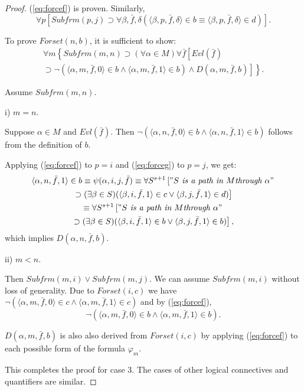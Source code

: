 \documentclass{asl}
\theoremstyle{definition}
\begin{document}
\begin{proof}
(\ref{eq:forcef}) is proven. Similarly,
\begin{equation}
\forall p\left[Subfrm(p,j)\supset \forall\beta,\bar{f},\delta\left(\langle\beta, p,\bar{f},\delta\rangle\in b\equiv\langle\beta, p,\bar{f},\delta\rangle\in d \right) \right].
\label{eq:forceg}
\end{equation}

To prove $Forset(n,b)$, it is sufficient to show:
\begin{multline}
\forall m\left\lbrace Subfrm(m,n)\supset(\forall\alpha\in M)\forall\bar{f}\left[Evl(\bar{f})
\right.
\right.
\\
\left.
\left.
\supset
\neg(\langle\alpha, m,\bar{f},0\rangle\in b\wedge\langle\alpha, m,\bar{f},1\rangle\in b)\wedge D(\alpha,m,\bar{f},b)\right]\right\rbrace .
\label{eq:forcea}
\end{multline}

Assume $Subfrm(m,n)$.

i) $m=n$.

Suppose $\alpha\in M$ and $Evl(\bar{f})$. Then $\neg(\langle\alpha, n,\bar{f},0\rangle\in b\wedge\langle\alpha, n,\bar{f},1\rangle\in b)$ follows from the definition of $b$.

Applying (\ref{eq:forcef}) to $p=i$ and (\ref{eq:forceg}) to $p=j$, we get:
\begin{multline*}
\langle\alpha,n,\bar{f},1\rangle\in b\equiv\psi(\alpha, i,j,\bar{f})
\equiv\forall S^{s+1}\left["S\textit{ is a path in }M
\textit{through }\alpha" 
\right.
\\
\left.
\supset(\exists\beta\in S)(\langle \beta,i,\bar{f},1\rangle\in c\vee\langle \beta,j,\bar{f},1\rangle\in d)\right]
\\
\equiv\forall S^{s+1}\left["S\textit{ is a path in }M
\textit{through }\alpha" 
\right.
\\
\left.
\supset(\exists\beta\in S)(\langle \beta,i,\bar{f},1\rangle\in b\vee\langle \beta,j,\bar{f},1\rangle\in b)\right],
\end{multline*}
which implies $D(\alpha,n,\bar{f},b)$.

ii) $m<n$.

Then $Subfrm(m,i)\vee Subfrm(m,j)$. We can assume $Subfrm(m,i)$ without loss of generality. Due to $Forset(i,c)$ we have $\neg(\langle\alpha, m,\bar{f},0\rangle\in c\wedge\langle\alpha, m,\bar{f},1\rangle\in c)$ and by (\ref{eq:forcef}), 
\[\neg(\langle\alpha, m,\bar{f},0\rangle\in b\wedge\langle\alpha, m,\bar{f},1\rangle\in b).\] 
 
$D(\alpha,m,\bar{f},b)$ is also also derived from $Forset (i,c)$ by applying (\ref{eq:forcef}) to each possible form of the formula $\varphi_m$.

This completes the proof for case 3. The cases of other logical connectives and quantifiers are similar.
\end{proof}
\end{document}
